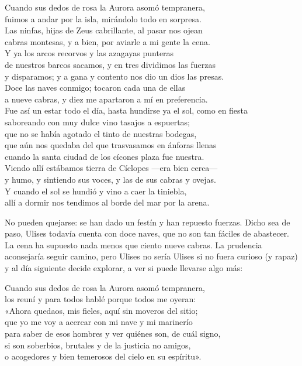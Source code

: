 \begin{versocita}
Cuando sus dedos de rosa la Aurora asomó tempranera,\\
fuimos a andar por la isla, mirándolo todo en sorpresa.\\
Las ninfas, hijas de Zeus cabrillante, al pasar nos ojean\\
cabras montesas, y a bien, por aviarle a mi gente la cena.\\
Y ya los arcos recorvos y las azagayas punteras\\
de nuestros barcos sacamos, y en tres dividimos las fuerzas\\
y disparamos; y a gana y contento nos dio un dios las presas.\\
\stanzabreak
Doce las naves conmigo; tocaron cada una de ellas\\
a nueve cabras, y diez me apartaron a mí en preferencia.\\
Fue así un estar todo el día, hasta hundirse ya el sol, como en fiesta\\
saboreando con muy dulce vino tasajos a espuertas;\\
que no se había agotado el tinto de nuestras bodegas,\\
que aún nos quedaba del que trasvasamos en ánforas llenas\\
cuando la santa ciudad de los cícones plaza fue nuestra.\\
Viendo allí estábamos tierra de Cíclopes ---era bien cerca---\\
y humo, y sintiendo sus voces, y las de sus cabras y ovejas.\\
Y cuando el sol se hundió y vino a caer la tiniebla,\\
allí a dormir nos tendimos al borde del mar por la arena.
\end{versocita}

No pueden quejarse: se han dado un festín y han repuesto fuerzas. Dicho sea de paso, Ulises todavía cuenta con doce naves, que no son tan fáciles de abastecer. La cena ha supuesto nada menos que ciento nueve cabras. La prudencia aconsejaría seguir camino, pero Ulises no sería Ulises si no fuera curioso (y rapaz) y al día siguiente decide explorar, a ver si puede llevarse algo más:

\begin{versocita}
Cuando sus dedos de rosa la Aurora asomó tempranera,\\
los reuní y para todos hablé porque todos me oyeran:\\
«Ahora quedaos, mis fieles, aquí sin moveros del sitio;\\
que yo me voy a acercar con mi nave y mi marinerío\\
para saber de esos hombres y ver quiénes son, de cuál signo,\\
si son soberbios, brutales y de la justicia no amigos,\\
o acogedores y bien temerosos del cielo en su espíritu».
\end{versocita}

